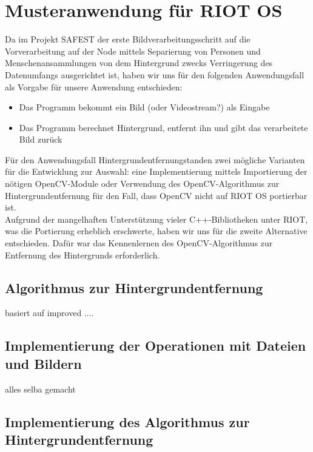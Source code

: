 \documentclass[10pt,a4paper]{article}
\begin{document}
\newpage
\section{Musteranwendung für RIOT OS}


Da im Projekt SAFEST der erste Bildverarbeitungsschritt auf die Vorverarbeitung auf der Node mittels Separierung von Personen und Menschenansammlungen von dem Hintergrund zwecks Verringerung des Datenumfangs ausgerichtet ist, haben wir uns für den folgenden Anwendungsfall als Vorgabe für unsere Anwendung entschieden: 

\begin{itemize}
\item Das Programm bekommt ein Bild (oder Videostream?) als Eingabe
\item Das Programm berechnet Hintergrund, entfernt ihn und gibt das verarbeitete Bild zurück
\end{itemize}

Für den Anwendungsfall \glqq Hintergrundentfernung\grqq standen zwei mögliche Varianten für die Entwicklung zur Auswahl: eine Implementierung mittels Importierung der nötigen OpenCV-Module oder Verwendung des OpenCV-Algorithmus zur Hintergrundentfernung für den Fall, dass OpenCV nicht auf RIOT OS portierbar ist. \\

Aufgrund der mangelhaften Unterstützung vieler C++-Bibliotheken unter RIOT, was die Portierung erheblich erschwerte, haben wir uns für die zweite Alternative entschieden. Dafür war das Kennenlernen des OpenCV-Algorithmus zur Entfernung des Hintergrunds erforderlich. \\

\subsection{Algorithmus zur Hintergrundentfernung}

basiert auf improved ....

\subsection{Implementierung der Operationen mit Dateien und Bildern}

alles selba gemacht

\subsection{Implementierung des Algorithmus zur Hintergrundentfernung}
\end{document}
